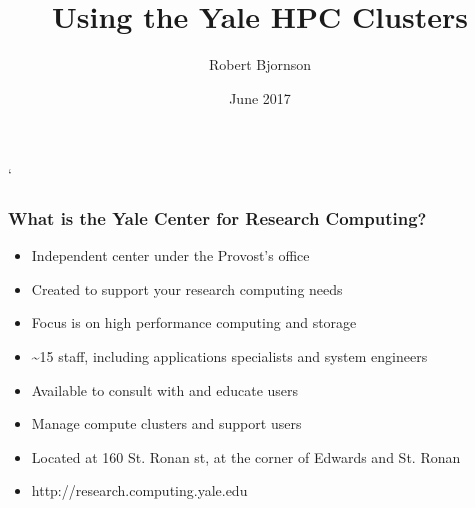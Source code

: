 \documentclass[10pt]{beamer}
\begin{document}
\title{Using the Yale HPC Clusters}`
\author{{Robert Bjornson}}
\date{June 2017}

\begin{frame}[plain]
  \titlepage
\end{frame}

\begin{frame}[fragile]
\frametitle{What is the Yale Center for Research Computing?}

\begin{itemize}
\item Independent center under the Provost's office
\item Created to support your research computing needs
\item Focus is on high performance computing and storage
\item \textasciitilde 15 staff, including applications specialists and system engineers
\item Available to consult with and educate users
\item Manage compute clusters and support users
\item Located at 160 St. Ronan st, at the corner of Edwards and St. Ronan
\item http://research.computing.yale.edu
\end{itemize}

\end{frame}
\end{document}

